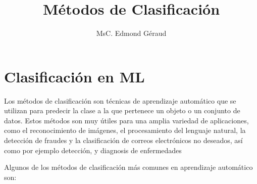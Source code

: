 \documentclass[
  letterpaper,
  DIV=11,
  numbers=noendperiod]{scrartcl}
\title{Métodos de Clasificación}
\author{MsC. Edmond Géraud}
\date{}
\renewcommand*\contentsname{Table of contents}
\newcommand\contentsname{Table of contents}
\begin{document}
\maketitle
\ifdefined\Shaded\renewenvironment{Shaded}{\begin{tcolorbox}[enhanced, frame hidden, sharp corners, breakable, boxrule=0pt, borderline west={3pt}{0pt}{shadecolor}, interior hidden]}{\end{tcolorbox}}\fi

\renewcommand*\contentsname{Table of contents}
{
\hypersetup{linkcolor=}
\setcounter{tocdepth}{4}
\tableofcontents
}
\hypertarget{clasificaciuxf3n-en-ml}{%
\section{Clasificación en ML}\label{clasificaciuxf3n-en-ml}}

Los métodos de clasificación son técnicas de aprendizaje automático que
se utilizan para predecir la clase a la que pertenece un objeto o un
conjunto de datos. Estos métodos son muy útiles para una amplia variedad
de aplicaciones, como el reconocimiento de imágenes, el procesamiento
del lenguaje natural, la detección de fraudes y la clasificación de
correos electrónicos no deseados, así como por ejemplo detección, y
diagnosis de enfermedades

Algunos de los métodos de clasificación más comunes en aprendizaje
automático son:
\end{document}
